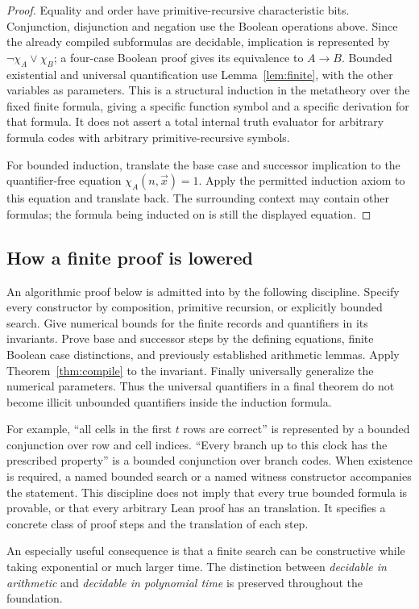 \begin{proof}
Equality and order have primitive-recursive characteristic bits. Conjunction,
disjunction and negation use the Boolean operations above. Since the already
compiled subformulas are decidable, implication is represented by
\(\neg\chi_A\vee\chi_B\); a four-case Boolean proof gives its equivalence
to \(A\to B\). Bounded existential and universal quantification use
Lemma~\ref{lem:finite}, with the other variables as parameters. This is a
structural induction in the metatheory over the fixed finite formula, giving
a specific function symbol and a specific derivation for that formula. It
does not assert a total internal truth evaluator for arbitrary formula codes
with arbitrary primitive-recursive symbols.

For bounded induction, translate the base case and successor implication to
the quantifier-free equation \(\chi_A(n,\vec x)=1\). Apply the permitted
induction axiom to this equation and translate back. The surrounding context
may contain other formulas; the formula being inducted on is still the
displayed equation.
\end{proof}

\subsection{How a finite proof is lowered}

An algorithmic proof below is admitted into \ipra{} by the following
discipline. Specify every constructor by composition, primitive recursion,
or explicitly bounded search. Give numerical bounds for the finite records
and quantifiers in its invariants. Prove base and successor steps by the
defining equations, finite Boolean case distinctions, and previously
established arithmetic lemmas. Apply Theorem~\ref{thm:compile} to the invariant.
Finally universally generalize the numerical parameters. Thus the universal
quantifiers in a final theorem do not become illicit unbounded quantifiers
inside the induction formula.

For example, ``all cells in the first \(t\) rows are correct'' is represented
by a bounded conjunction over row and cell indices. ``Every branch up to this
clock has the prescribed property'' is a bounded conjunction over branch
codes. When existence is required, a named bounded search or a named witness
constructor accompanies the statement. This discipline does not imply that
every true bounded formula is provable, or that every arbitrary Lean proof
has an \ipra{} translation. It specifies a concrete class of proof steps
and the translation of each step.

An especially useful consequence is that a finite search can be constructive
while taking exponential or much larger time. The distinction between
\emph{decidable in arithmetic} and \emph{decidable in polynomial time} is
preserved throughout the foundation.
